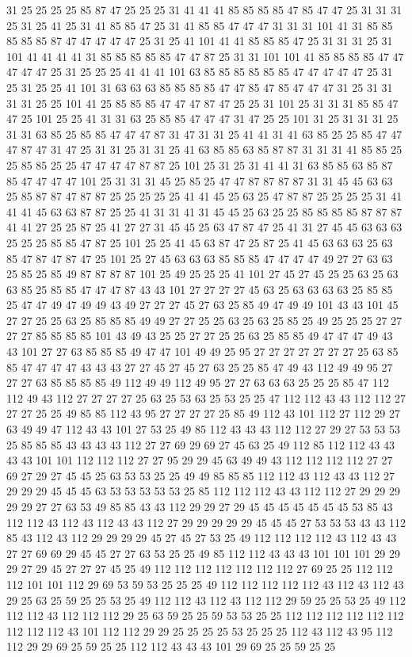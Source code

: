 31 25 25 25 25 85 87 47 25 25 25 31 41 41 41 85 85 85 85 47 85 47 47 25 31 31 31 25 31 25 41 25 31 41 85 85 47 25 31 41 85 85 47 47 47 31 31 31 101 41 31 85 85 85 85 85 87 47 47 47 47 47 25 31 25 41 101 41 41 85 85 85 47 25 31 31 31 25 31 101 41 41 41 41 31 85 85 85 85 85 47 47 87 25 31 31 101 101 41 85 85 85 85 47 47 47 47 47 25 31 25 25 25 41 41 41 101 63 85 85 85 85 85 85 47 47 47 47 47 25 31 25 31 25 25 41 101 31 63 63 63 85 85 85 85 47 47 85 47 85 47 47 47 31 25 31 31 31 31 25 25 101 41 25 85 85 85 47 47 47 87 47 25 25 31 101 25 31 31 31 85 85 47 47 25 101 25 25 41 31 31 63 25 85 85 47 47 47 31 47 25 25 101 31 25 31 31 31 25 31 31 63 85 25 85 85 47 47 47 87 31 47 31 31 25 41 41 31 41 63 85 25 25 85 47 47 47 87 47 31 47 25 31 31 25 31 31 25 41 63 85 85 63 85 87 87 31 31 31 41 85 85 25 25 85 85 25 25 47 47 47 47 87 87 25 101 25 31 25 31 41 41 31 63 85 85 63 85 87 85 47 47 47 47 101 25 31 31 31 45 25 85 25 47 47 87 87 87 87 31 31 45 45 63 63 25 85 87 87 47 87 87 25 25 25 25 25 41 41 45 25 63 25 47 87 87 25 25 25 25 31 41 41 41 45 63 63 87 87 25 25 41 31 31 41 31 45 45 25 63 25 25 85 85 85 85 87 87 87 41 41 27 25 25 87 25 41 27 27 31 45 45 25 63 47 87 47 25 41 31 27 45 45 63 63 63 25 25 25 85 85 47 87 25 101 25 25 41 45 63 87 47 25 87 25 41 45 63 63 63 25 63 85 47 87 47 87 47 25 101 25 27 45 63 63 63 85 85 85 47 47 47 47 49 27 27 63 63 25 85 25 85 49 87 87 87 87 101 25 49 25 25 25 41 101 27 45 27 45 25 25 63 25 63 63 85 25 85 85 47 47 47 87 43 43 101 27 27 27 27 45 63 25 63 63 63 63 25 85 85 25 47 47 49 47 49 49 43 49 27 27 27 45 27 63 25 85 49 47 49 49 101 43 43 101 45 27 27 25 25 63 25 85 85 85 49 49 27 27 25 25 63 25 63 25 85 25 49 25 25 25 27 27 27 27 85 85 85 85 101 43 49 43 25 25 27 27 25 25 63 25 85 85 49 47 47 47 49 43 43 101 27 27 63 85 85 85 49 47 47 101 49 49 25 95 27 27 27 27 27 27 27 25 63 85 85 47 47 47 47 43 43 43 27 27 45 27 45 27 63 25 25 85 47 49 43 112 49 49 95 27 27 27 63 85 85 85 85 49 112 49 49 112 49 95 27 27 63 63 63 25 25 25 85 47 112 112 49 43 112 27 27 27 27 25 63 25 53 63 25 53 25 25 47 112 112 43 43 112 112 27 27 27 25 25 49 85 85 112 43 95 27 27 27 27 25 85 49 112 43 101 112 27 112 29 27 63 49 49 47 112 43 43 101 27 53 25 49 85 112 43 43 43 112 112 27 29 27 53 53 53 25 85 85 85 43 43 43 43 112 27 27 69 29 69 27 45 63 25 49 112 85 112 112 43 43 43 43 101 101 112 112 112 27 27 95 29 29 45 63 49 49 43 112 112 112 112 27 27 69 27 29 27 45 45 25 63 53 53 25 25 49 49 85 85 85 112 112 43 112 43 43 112 27 29 29 29 45 45 45 63 53 53 53 53 53 25 85 112 112 112 43 43 112 112 27 29 29 29 29 29 27 27 63 53 49 85 85 43 43 112 29 29 27 29 45 45 45 45 45 45 45 53 85 43 112 112 43 112 43 112 43 43 112 27 29 29 29 29 29 45 45 45 27 53 53 53 43 43 112 85 43 112 43 112 29 29 29 29 45 27 45 27 53 25 49 112 112 112 112 43 112 43 43 27 27 69 69 29 45 45 27 27 63 53 25 25 49 85 112 112 43 43 43 101 101 101 29 29 29 27 29 45 27 27 27 45 25 49 112 112 112 112 112 112 112 27 69 25 25 112 112 112 101 101 112 29 69 53 59 53 25 25 25 49 112 112 112 112 112 43 112 43 112 43 29 25 63 25 59 25 25 53 25 49 112 112 43 112 43 112 112 29 59 25 25 53 25 49 112 112 112 43 112 112 112 29 25 63 59 25 25 59 53 53 25 25 112 112 112 112 112 112 112 112 112 43 101 112 112 29 29 25 25 25 25 53 25 25 25 112 43 112 43 95 112 112 29 29 69 25 59 25 25 112 112 43 43 43 101 29 69 25 25 59 25 25 